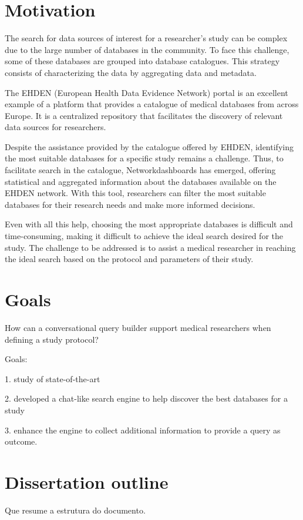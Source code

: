 \section{Motivation}

The search for data sources of interest for a researcher’s study can be complex due to the large number of databases in the community. To face this challenge, some of these databases are grouped into database catalogues. This strategy consists of characterizing the data by aggregating data and metadata.

The EHDEN (European Health Data Evidence Network) portal is an excellent example of a platform that provides a catalogue of medical databases from across Europe. It is a centralized repository that facilitates the discovery of relevant data sources for researchers.

Despite the assistance provided by the catalogue offered by EHDEN, identifying the most suitable databases for a specific study remains a challenge. Thus, to facilitate search in the catalogue, Networkdashboards has emerged, offering statistical and aggregated information about the databases available on the EHDEN network. With this tool, researchers can filter the most suitable databases for their research needs and make more informed decisions.

Even with all this help, choosing the most appropriate databases is difficult and time-consuming, making it difficult to achieve the ideal search desired for the study. The challenge to be addressed is to assist a medical researcher in reaching the ideal search based on the protocol and parameters of their study.


\section{Goals}

How can a conversational query builder support medical researchers when defining a study protocol?

Goals:

1. study of state-of-the-art

2. developed a chat-like search engine to help discover the best databases for a study

3. enhance the engine to collect additional information to provide a query as outcome.

\section{Dissertation outline}

Que resume a estrutura do documento.

